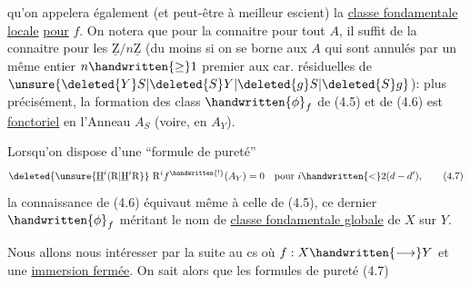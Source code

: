 qu'on appelera également (et peut-être à meilleur escient) la \uline{classe fondamentale locale} \uline{pour} $f$. On notera que pour la connaitre pour tout $A$, il suffit de la connaitre pour les $\underline{\mathrm{Z}}/n\underline{\mathrm{Z}}$ (du moins si on se borne aux $A$ qui sont annulés par un même entier $n\handwritten{\geq}1$ premier aux car. résiduelles de $\unsure{\deleted{Y}S|\deleted{S}Y|\deleted{g}S|\deleted{S}g}$):  plus précisément, la formation des class $\handwritten{\phi}_f$ de (4.5) et de (4.6) est \uline{fonctoriel} en l'Anneau $A_S$ (voire, en $A_Y$).

Lorsqu'on dispose d'une ``formule de pureté''
\[
\deleted{\unsure{\underline{\mathrm{H}}^i(\mathrm{R}|\underline{\mathrm{H}}^i\mathrm{R}}}\ \mathrm{R}^i f^{\handwritten{!}}(A_Y)=0\quad\text{pour }i\handwritten{<}2(d-d'),
\tag*{(4.7)}
\]
la connaissance de (4.6) équivaut même à celle de (4.5), ce dernier $\handwritten{\phi}_f$ méritant le nom de \uline{classe fondamentale globale} de $X$ sur $Y$.

Nous allons nous intéresser par la suite au cs où $f:X\handwritten{\longrightarrow}Y$ et une \uline{immersion fermée}. On sait alors que les formules de pureté (4.7)
